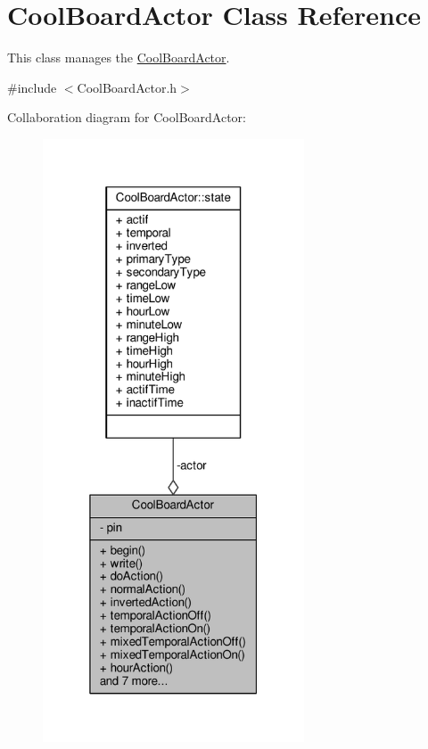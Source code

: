 \hypertarget{class_cool_board_actor}{}\section{Cool\+Board\+Actor Class Reference}
\label{class_cool_board_actor}


This class manages the \hyperlink{class_cool_board_actor}{Cool\+Board\+Actor}.  




{\ttfamily \#include $<$Cool\+Board\+Actor.\+h$>$}



Collaboration diagram for Cool\+Board\+Actor\+:\nopagebreak
\begin{figure}[H]
\begin{center}
\leavevmode
\includegraphics[width=220pt]{d6/d3e/class_cool_board_actor__coll__graph}
\end{center}
\end{figure}
